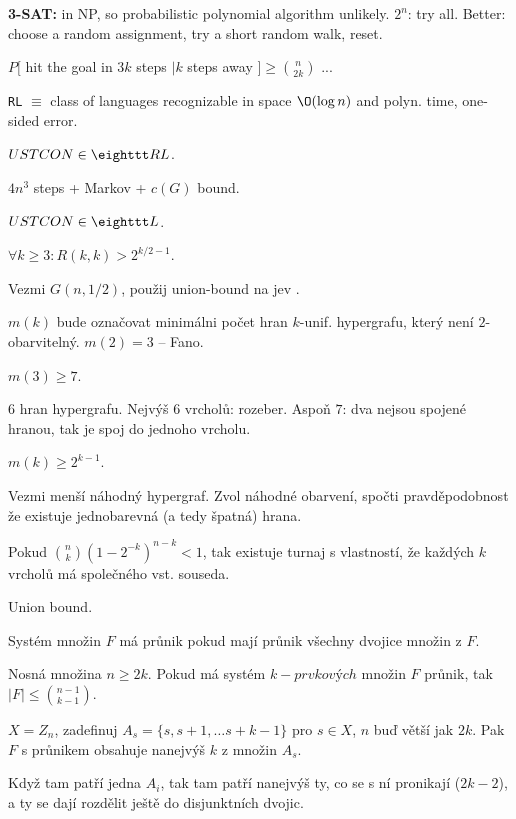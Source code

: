 {\bf 3-SAT:} in NP, so probabilistic polynomial algorithm unlikely. $2^n$: try all.
Better: choose a random assignment, try a short random walk, reset.

\obs{} $P[$ hit the goal in $3k$ steps $| k$ steps away $ ] \ge
{n \choose 2k}$ ...

\dfn{} {\tt RL} $\equiv$ class of languages recognizable in space $\O(\log n)$ and polyn. time,
one-sided error.

\thm{} $USTCON \in {\tt RL}$.

\prf{} $4n^3$ steps + Markov + $c(G)$ bound.

 $USTCON \in {\tt L}$. 


 $\forall k \ge 3: R(k,k) > 2^{k/2 - 1}$.

\prf{} Vezmi $G(n,1/2)$, použij union-bound na jev .

\dfn{}$m(k)$ bude označovat minimálni počet hran $k$-unif. hypergrafu, který není
$2$-obarvitelný. $m(2) = 3$ -- Fano.

\obs{} $m(3) \ge 7$.

\prf{} $6$ hran hypergrafu. Nejvýš $6$ vrcholů: rozeber. Aspoň $7$: dva nejsou
spojené hranou, tak je spoj do jednoho vrcholu.

 $m(k) \ge 2^{k-1}$.

\prf{} Vezmi menší náhodný hypergraf. Zvol náhodné obarvení, spočti
pravděpodobnost že existuje jednobarevná (a tedy špatná) hrana.

\thm{} Pokud ${n \choose k} (1 - 2^{-k})^{n-k} <1$, tak existuje turnaj
s vlastností, že každých $k$ vrcholů má společného vst. souseda.

\prf{} Union bound.


\dfn{} Systém množin $F$ {\I má průnik} pokud mají průnik všechny dvojice množin z $F$.

 Nosná množina $n \ge 2k$. Pokud má systém
$k-prvkových$ množin $F$ průnik, tak $|F| \le {n-1 \choose k-1}$.

 $X = Z_n$, zadefinuj $A_s = \{s,s+1,\dots s+k-1\}$ pro $s \in X$, $n$ buď
větší jak $2k$.  Pak $F$ s průnikem obsahuje nanejvýš $k$ z množin $A_s$.

\prf{} Když tam patří jedna $A_i$, tak tam patří nanejvýš ty, co se s ní pronikají ($2k-2$), a
ty se dají rozdělit ještě do disjunktních dvojic.

